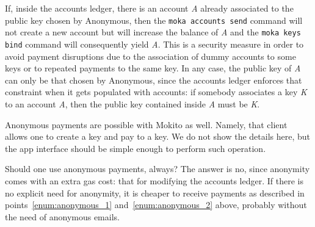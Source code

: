 \begin{commentbox}
If, inside the accounts ledger, there is an account \emph{A} already associated to the
public key chosen by Anonymous,
then the \texttt{moka accounts send} command will not create a new account but will increase the
balance of \emph{A} and the \texttt{moka keys bind} command will consequently yield \emph{A}.
This is a security measure in order
to avoid payment disruptions due to the association of dummy accounts to some keys
or to repeated payments to the same key.
In any case, the public key of \emph{A} can only be that chosen by Anonymous,
since the accounts ledger
enforces that constraint when it gets populated with accounts:
if somebody associates a key \emph{K} to an account \emph{A}, then the public key
contained inside \emph{A} must be \emph{K}.
\end{commentbox}

Anonymous payments are possible with Mokito as well. Namely, that client
allows one to create a key and pay to a key. We do not show the details here, but the
app interface should be simple enough to perform such operation.

Should one use anonymous payments, always? The answer is no, since
anonymity comes with an extra gas cost: that for modifying the accounts ledger.
If there is no explicit need for anonymity, it is cheaper to receive payments
as described in points~\ref{enum:anonymous_1}
and~\ref{enum:anonymous_2} above, probably without the need of anonymous emails.
